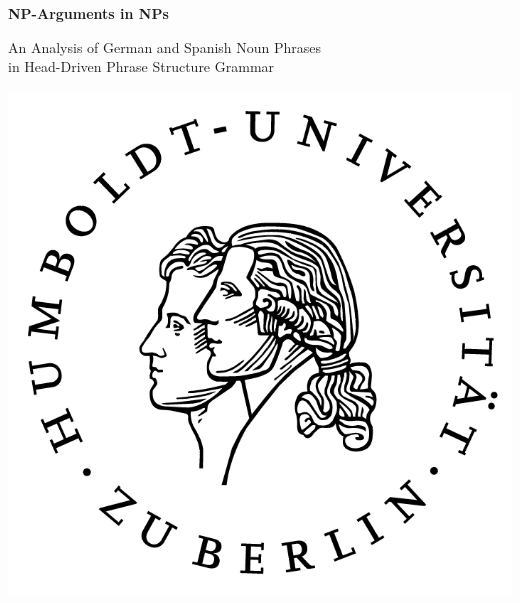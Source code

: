

\thispagestyle{empty}


\vspace{5.6cm}

\begin{center}

\begin{minipage}{.99\textwidth}
	\begin{center}

	\begin{huge}
	\textbf{NP-Arguments in NPs}
	\end{huge}

	\end{center}
\end{minipage}


\vspace{.5cm}

\begin{minipage}{.99\textwidth}
	\begin{center}
	\doublespacing

	\begin{Large}
	An Analysis of German and Spanish Noun Phrases\\
	in Head-Driven Phrase Structure Grammar
	\end{Large}

	\end{center}
\end{minipage}


\vspace{1.4cm}


\begin{minipage}{.99\textwidth}
	\begin{center}

	\includegraphics[scale=1]{graphics/husiegelswgross}


\end{center}
\end{minipage}
\end{center}
